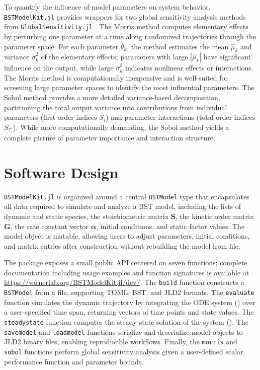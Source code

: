 \documentclass[11pt]{article}
\begin{document}
To quantify the influence of model parameters on system behavior, \texttt{BSTModelKit.jl} provides wrappers for two global sensitivity analysis methods from \texttt{GlobalSensitivity.jl} \citep{Dixit2022}. The Morris method \citep{Morris1991} computes elementary effects by perturbing one parameter at a time along randomized trajectories through the parameter space. For each parameter $\theta_k$, the method estimates the mean $\hat{\mu}_k$ and variance $\hat{\sigma}_k^2$ of the elementary effects; parameters with large $|\hat{\mu}_k|$ have significant influence on the output, while large $\hat{\sigma}_k^2$ indicates nonlinear effects or interactions. The Morris method is computationally inexpensive and is well-suited for screening large parameter spaces to identify the most influential parameters. The Sobol method \citep{Sobol2001} provides a more detailed variance-based decomposition, partitioning the total output variance into contributions from individual parameters (first-order indices $S_i$) and parameter interactions (total-order indices $S_{T_i}$). While more computationally demanding, the Sobol method yields a complete picture of parameter importance and interaction structure.

\section{Software Design}\label{sec:software}
\texttt{BSTModelKit.jl} is organized around a central \texttt{BSTModel} type that encapsulates all data required to simulate and analyze a BST model, including the lists of dynamic and static species, the stoichiometric matrix $\mathbf{S}$, the kinetic order matrix $\mathbf{G}$, the rate constant vector $\boldsymbol{\alpha}$, initial conditions, and static factor values. The model object is mutable, allowing users to adjust parameters, initial conditions, and matrix entries after construction without rebuilding the model from file.

The package exposes a small public API centered on seven functions; complete documentation including usage examples and function signatures is available at \url{https://varnerlab.org/BSTModelKit.jl/dev/}. The \texttt{build} function constructs a \texttt{BSTModel} from a file, supporting TOML, BST, and JLD2 formats. The \texttt{evaluate} function simulates the dynamic trajectory by integrating the ODE system () over a user-specified time span, returning vectors of time points and state values. The \texttt{steadystate} function computes the steady-state solution of the system (). The \texttt{savemodel} and \texttt{loadmodel} functions serialize and deserialize model objects to JLD2 binary files, enabling reproducible workflows. Finally, the \texttt{morris} and \texttt{sobol} functions perform global sensitivity analysis given a user-defined scalar performance function and parameter bounds.
\end{document}
